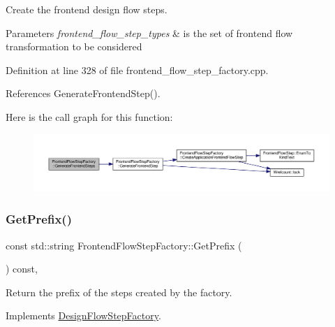 Create the frontend design flow steps. 


\begin{DoxyParams}{Parameters}
{\em frontend\+\_\+flow\+\_\+step\+\_\+types} & is the set of frontend flow transformation to be considered \\
\hline
\end{DoxyParams}


Definition at line 328 of file frontend\+\_\+flow\+\_\+step\+\_\+factory.\+cpp.



References Generate\+Frontend\+Step().

Here is the call graph for this function\+:
\nopagebreak
\begin{figure}[H]
\begin{center}
\leavevmode
\includegraphics[width=350pt]{db/dd6/classFrontendFlowStepFactory_af2ae8d671cc18ec7bb69e8dc249d18d7_cgraph}
\end{center}
\end{figure}
\mbox{\label{classFrontendFlowStepFactory_af3ccb203f94d1774361a9095694ab11f}} 
\subsubsection{\texorpdfstring{Get\+Prefix()}{GetPrefix()}}
{\footnotesize\ttfamily const std\+::string Frontend\+Flow\+Step\+Factory\+::\+Get\+Prefix (\begin{DoxyParamCaption}{ }\end{DoxyParamCaption}) const\hspace{0.3cm}{\ttfamily [override]}, {\ttfamily [virtual]}}



Return the prefix of the steps created by the factory. 



Implements \hyperlink{classDesignFlowStepFactory_a52abfc00c170b5a63e84431b75eb698e}{Design\+Flow\+Step\+Factory}.



